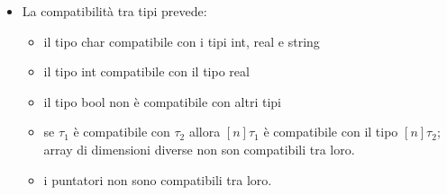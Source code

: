 \documentclass{report}
\begin{document}
\begin {itemize}
    \item La compatibilità tra tipi prevede:
    \begin{itemize}
        \item il tipo char compatibile con i tipi int, real e string
        \item il tipo int compatibile con il tipo real
        \item il tipo bool non è compatibile con altri tipi
        \item se $\tau_1$ è compatibile con $\tau_2$ allora $[n]\tau_1$ è compatibile con il tipo $[n]\tau_2$;
            array di dimensioni diverse non son compatibili tra loro.
        \item i puntatori non sono compatibili tra loro.

    \end{itemize}


\end{itemize}
\end{document}

